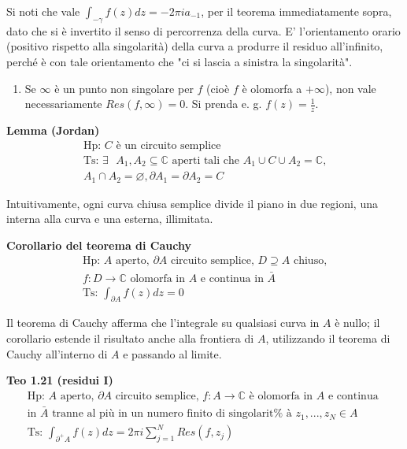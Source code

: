 \documentclass{article}
\begin{document}
Si noti che vale $\int_{-\gamma }f\left( z\right) dz=-2\pi ia_{-1}$, per il
teorema immediatamente sopra, dato che si \`{e} invertito il senso di
percorrenza della curva. E' l'orientamento orario (positivo rispetto alla
singolarit\`{a}) della curva a produrre il residuo all'infinito, perch\'{e} 
\`{e} con tale orientamento che "ci si lascia a sinistra la singolarit\`{a}".

\begin{enumerate}
\item Se $\infty $ \`{e} un punto non singolare per $f$ (cio\`{e} $f$ \`{e}
olomorfa a $+\infty $), non vale necessariamente $Res\left( f,\infty \right)
=0$. Si prenda e. g. $f\left( z\right) =\frac{1}{z}$.
\end{enumerate}

\textbf{Lemma (Jordan)}%
\begin{gather*}
\text{Hp: }C\text{ \`{e} un circuito semplice} \\
\text{Ts: }\exists \text{ }A_{1},A_{2}\subseteq 
\mathbb{C}
\text{ aperti tali che }A_{1}\cup C\cup A_{2}=%
\mathbb{C}
\text{,} \\
A_{1}\cap A_{2}=\varnothing ,\partial A_{1}=\partial A_{2}=C
\end{gather*}

Intuitivamente, ogni curva chiusa semplice divide il piano in due regioni,
una interna alla curva e una esterna, illimitata.

\textbf{Corollario del teorema di Cauchy}%
\begin{gather*}
\text{Hp: }A\text{ aperto, }\partial A\text{ circuito semplice, }D\supseteq A%
\text{ chiuso,} \\
f:D\rightarrow 
\mathbb{C}
\text{ olomorfa in }A\text{ e continua in }\bar{A} \\
\text{Ts: }\int_{\partial A}f\left( z\right) dz=0
\end{gather*}

Il teorema di Cauchy afferma che l'integrale su qualsiasi curva in $A$ \`{e}
nullo; il corollario estende il risultato anche alla frontiera di $A$,
utilizzando il teorema di Cauchy all'interno di $A$ e passando al limite.


\textbf{Teo 1.21 (residui I)}%
\begin{gather*}
\text{Hp: }A\text{ aperto, }\partial A\text{ circuito semplice, }%
f:A\rightarrow 
\mathbb{C}
\text{ \`{e} olomorfa in }A\text{ e continua } \\
\text{in }\bar{A}\text{ tranne al pi\`{u} in un numero finito di singolarit%
\`{a} }z_{1},...,z_{N}\in A \\
\text{Ts: }\int_{\partial ^{+}A}f\left( z\right) dz=2\pi
i\sum_{j=1}^{N}Res\left( f,z_{j}\right)
\end{gather*}
\end{document}
